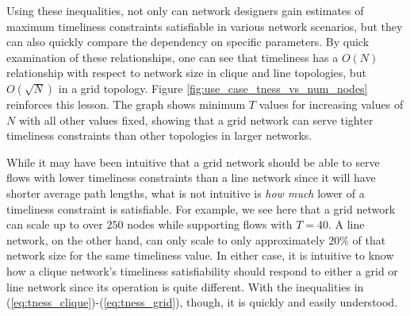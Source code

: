 Using these inequalities, not only can network designers gain estimates of maximum timeliness constraints satisfiable in various network scenarios, but they can also quickly compare the dependency on specific parameters.  By quick examination of these relationships, one can see that timeliness has a $O(N)$ relationship with respect to network size in clique and line topologies, but $O(\sqrt{N})$ in a grid topology.  Figure \ref{fig:use_case_tness_vs_num_nodes} reinforces this lesson.  The graph shows minimum $T$ values for increasing values of $N$ with all other values fixed, showing that a grid network can serve tighter timeliness constraints than other topologies in larger networks.

While it may have been intuitive that a grid network should be able to serve flows with lower timeliness constraints than a line network since it will have shorter average path lengths, what is not intuitive is \emph{how much} lower of a timeliness constraint is satisfiable.  For example, we see here that a grid network can scale up to over $250$ nodes while supporting flows with $T = 40$.  A line network, on the other hand, can only scale to only approximately $20\%$ of that network size for the same timeliness value.  In either case, it is intuitive to know how a clique network's timeliness satisfiability should respond to either a grid or line network since its operation is quite different.  With the inequalities in (\ref{eq:tness_clique})-(\ref{eq:tness_grid}), though, it is quickly and easily understood.

